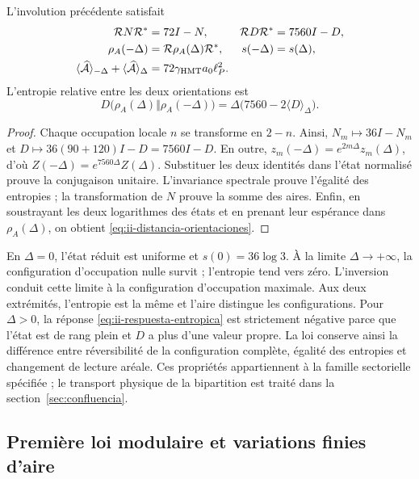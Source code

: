 \begin{theorem}
L'involution précédente satisfait
\begin{align}
 \mathcal R N\mathcal R^*&=72I-N,&
 \mathcal R D\mathcal R^*&=7560I-D,\\
 \rho_A(-\Delta)&=\mathcal R\rho_A(\Delta)\mathcal R^*,&
 s(-\Delta)&=s(\Delta),
 \label{eq:ii-inversion-entropia}\\
 \langle\widehat{\mathcal A}\rangle_{-\Delta}
 +\langle\widehat{\mathcal A}\rangle_\Delta
 &=72\gamma_{\mathrm{HMT}}a_0\ell_P^2.&&
 \label{eq:ii-area-complementaria}
\end{align}
L'entropie relative entre les deux orientations est
\begin{equation}
 D\bigl(\rho_A(\Delta)\Vert\rho_A(-\Delta)\bigr)
 =\Delta\bigl(7560-2\langle D\rangle_\Delta\bigr).
 \label{eq:ii-distancia-orientaciones}
\end{equation}
\end{theorem}
\begin{proof}
Chaque occupation locale $n$ se transforme en $2-n$. Ainsi,
$N_m\mapsto36I-N_m$ et
$D\mapsto36(90+120)I-D=7560I-D$.
En outre, $z_m(-\Delta)=e^{2m\Delta}z_m(\Delta)$,
d'où $Z(-\Delta)=e^{7560\Delta}Z(\Delta)$.
Substituer les deux identités dans l'état normalisé prouve la
conjugaison unitaire. L'invariance spectrale prouve l'égalité
des entropies ; la transformation de $N$ prouve la somme des aires.
Enfin, en soustrayant les deux logarithmes des états et en prenant
leur espérance dans $\rho_A(\Delta)$, on obtient
\eqref{eq:ii-distancia-orientaciones}.
\end{proof}

En $\Delta=0$, l’état réduit est uniforme et
$s(0)=36\log3$. À la limite $\Delta\to+\infty$, la configuration
d’occupation nulle survit ; l’entropie tend vers zéro.
L’inversion conduit cette limite à la configuration d’occupation maximale.
Aux deux extrémités, l’entropie est la même et l’aire distingue les
configurations. Pour $\Delta>0$, la réponse
\eqref{eq:ii-respuesta-entropica} est strictement négative parce que
l’état est de rang plein et $D$ a plus d’une valeur propre.
La loi conserve ainsi la différence entre réversibilité de la
configuration complète, égalité des entropies et changement de lecture aréale.
Ces propriétés appartiennent à la famille sectorielle spécifiée ;
le transport physique de la bipartition est traité dans
la section~\ref{sec:confluencia}.

\subsection{Première loi modulaire et variations finies d'aire}
\label{sec:ii-area-ley-modular}

